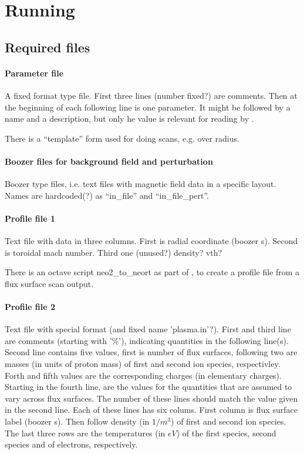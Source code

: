 \section{Running \neort}

\subsection{Required files}

\paragraph{Parameter file}
A fixed format type file. First three lines (number fixed?) are
comments. Then at the beginning of each following line is one parameter.
It might be followed by a name and a description, but only he value is
relevant for reading by \neort.

There is a ``template'' form used for doing scans, e.g. over radius.

\paragraph{Boozer files for background field and perturbation}
Boozer type files, i.e. text files with magnetic field data in a
specific layout. Names are hardcoded(?) as ``in_file'' and
``in_file_pert''.

\paragraph{Profile file 1}
Text file with data in three columns. First is radial coordinate
(boozer s). Second is toroidal mach number. Third one (unused?) density? vth?

There is an octave script neo2\_to\_neort as part of \neotwo, to
create a \neort profile file from a \neotwo flux surface scan output.

\paragraph{Profile file 2}
Text file with special format (and fixed name 'plasma.in'?). First and
third line are comments (starting with '\%'), indicating quantities in the
following line(s). Second line contains five values, first is number of
flux surfaces, following two are masses (in units of proton mass) of
first and second ion species, respectivley. Forth and fifth values are
the corresponding charges (in elementary charges).
Starting in the fourth line, are the values for the quantities that are
assumed to vary across flux surfaces. The number of these lines should
match the value given in the second line.
Each of these lines has six colums. First column is flux surface label
(boozer s). Then follow density (in $1/m^3$) of first and second ion
species.
The last three rows are the temperatures (in $eV$) of the first species,
second species and of electrons, respectively.

